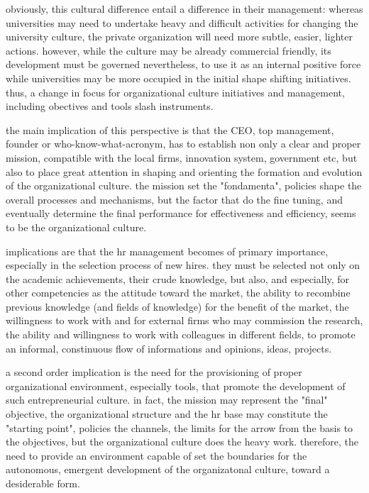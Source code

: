 obviously, this cultural difference entail a difference in their management: whereas universities may need to undertake heavy and difficult activities for changing the university culture, the private organization will need more subtle, easier, lighter actions. however, while the culture may be already commercial friendly, its development must be governed nevertheless, to use it as an internal positive force while universities may be more occupied in the initial shape shifting initiatives. thus, a change in focus for organizational culture initiatives and management, including obectives and tools slash instruments.

the main implication of this perspective is that the CEO, top management, founder or who-know-what-acronym, has to establish non only a clear and proper mission, compatible with the local firms, innovation system, government etc, but also to place great attention in shaping and orienting the formation and evolution of the organizational culture. the mission set the "fondamenta", policies shape the overall processes and mechanisms, but the factor that do the fine tuning, and eventually determine the final performance for effectiveness and efficiency, seems to be the organizational culture.

implications are that the hr management becomes of primary importance, especially in the selection process of new hires. they must be selected not only on the academic achievements, their crude knowledge, but also, and especially, for other competencies as the attitude toward the market, the ability to recombine previous knowledge (and fields of knowledge) for the benefit of the market, the willingness to work with and for external firms who may commission the research, the ability and willingness to work with colleagues in different fields, to promote an informal, constinuous flow of informations and opinions, ideas, projects. 

a second order implication is the need for the provisioning of proper organizational environment, especially tools, that promote the development of such entrepreneurial culture. in fact, the mission may represent the "final" objective, the organizational structure and the hr base may constitute the "starting point", policies the channels, the limits for the arrow from the basis to the objectives, but the organizational culture does the heavy work. therefore, the need to provide an environment capable of set the boundaries for the autonomous, emergent development of the organizatonal culture, toward a desiderable form.

